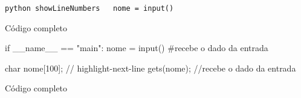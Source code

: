 \documentclass[
  letterpaper,
  DIV=11,
  numbers=noendperiod]{scrreprt}
\newenvironment{Shaded}{\begin{snugshade}}{\end{snugshade}}
\newcommand{\BuiltInTok}[1]{\textcolor[rgb]{0.00,0.23,0.31}{#1}}
\newcommand{\CommentTok}[1]{\textcolor[rgb]{0.37,0.37,0.37}{#1}}
\newcommand{\ControlFlowTok}[1]{\textcolor[rgb]{0.00,0.23,0.31}{#1}}
\newcommand{\DataTypeTok}[1]{\textcolor[rgb]{0.68,0.00,0.00}{#1}}
\newcommand{\DecValTok}[1]{\textcolor[rgb]{0.68,0.00,0.00}{#1}}
\newcommand{\NormalTok}[1]{\textcolor[rgb]{0.00,0.23,0.31}{#1}}
\newcommand{\OperatorTok}[1]{\textcolor[rgb]{0.37,0.37,0.37}{#1}}
\newcommand{\StringTok}[1]{\textcolor[rgb]{0.13,0.47,0.30}{#1}}
\newcommand{\VariableTok}[1]{\textcolor[rgb]{0.07,0.07,0.07}{#1}}
\begin{document}
\texttt{python\ showLineNumbers\ \ \ nome\ =\ input()}

Código completo

\begin{Shaded}
\begin{Highlighting}[]
    \ControlFlowTok{if} \VariableTok{\_\_name\_\_} \OperatorTok{==} \StringTok{"main"}\NormalTok{:}
\NormalTok{      nome }\OperatorTok{=} \BuiltInTok{input}\NormalTok{() }\CommentTok{\#recebe o dado da entrada}
\end{Highlighting}
\end{Shaded}

\begin{Shaded}
\begin{Highlighting}[]
\DataTypeTok{char}\NormalTok{ nome}\OperatorTok{[}\DecValTok{100}\OperatorTok{];}
\CommentTok{// highlight{-}next{-}line}
\NormalTok{gets}\OperatorTok{(}\NormalTok{nome}\OperatorTok{);} \CommentTok{//recebe o dado da entrada}
\end{Highlighting}
\end{Shaded}

Código completo
\end{document}
